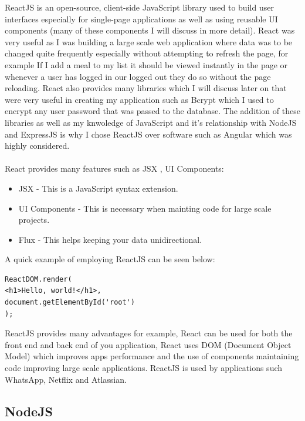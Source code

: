ReactJS is an open-source, client-side JavaScript library used to build user interfaces especially for single-page applications as well as using reusable UI components (many of these components I will discuss in more detail). React was very useful as I was building a large scale web application where data was to be changed quite frequently especially without attempting to refresh the page, for example If I add a meal to my list it should be viewed instantly in the page or whenever a user has logged in our logged out they do so without the page reloading. React also provides many libraries which I will discuss later on that were very useful in creating my application such as Bcrypt which I used to encrypt any user password that was passed to the database. The addition of these libraries as well as my knwoledge of JavaScript and it's relationship with NodeJS and ExpressJS is why I chose ReactJS over software such as Angular which was highly considered.\\ \\
React provides many features such as JSX , UI Components:
 \begin{itemize}
  \item JSX - This is a JavaScript syntax extension.
  \item UI Components - This is necessary when mainting code for large scale projects.
  \item Flux - This helps keeping your data unidirectional.
\end{itemize}
A quick example of employing ReactJS can be seen below:

\begin{verbatim}
ReactDOM.render(
<h1>Hello, world!</h1>,
document.getElementById('root')
);
\end{verbatim}

ReactJS provides many advantages for example, React can be used for both the front end and back end of you application, React uses DOM (Document Object Model) which improves apps performance and the use of components maintaining code improving large scale applications. ReactJS is used by applications such WhatsApp, Netflix and Atlassian.

\subsection{NodeJS}

